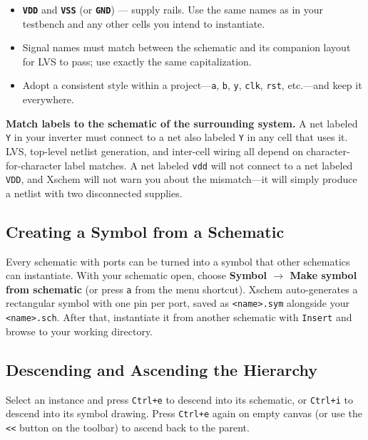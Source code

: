 \documentclass[11pt]{article}
\begin{document}
\begin{itemize}[leftmargin=2em]
  \item \textbf{\texttt{VDD}} and \textbf{\texttt{VSS}}
        (or \textbf{\texttt{GND}}) --- supply rails.
        Use the same names as in your testbench and any other
        cells you intend to instantiate.
  \item Signal names must match between the schematic and its companion
        layout for LVS to pass; use exactly the same capitalization.
  \item Adopt a consistent style within a project---\texttt{a},
        \texttt{b}, \texttt{y}, \texttt{clk}, \texttt{rst}, etc.---and
        keep it everywhere.
\end{itemize}

\begin{tipbox}
\textbf{Match labels to the schematic of the surrounding system.}
A net labeled \texttt{Y} in your inverter must connect to a net also
labeled \texttt{Y} in any cell that uses it.
LVS, top-level netlist generation, and inter-cell wiring all depend on
character-for-character label matches.
A net labeled \texttt{vdd} will not connect to a net labeled
\texttt{VDD}, and Xschem will not warn you about the mismatch---it will
simply produce a netlist with two disconnected supplies.
\end{tipbox}

\subsection{Creating a Symbol from a Schematic}

Every schematic with ports can be turned into a symbol that other
schematics can instantiate.
With your schematic open, choose \textbf{Symbol $\rightarrow$ Make
symbol from schematic} (or press \texttt{a} from the menu shortcut).
Xschem auto-generates a rectangular symbol with one pin per port,
saved as \texttt{<name>.sym} alongside your \texttt{<name>.sch}.
After that, instantiate it from another schematic with \texttt{Insert}
and browse to your working directory.

\subsection{Descending and Ascending the Hierarchy}

Select an instance and press \texttt{Ctrl+e} to descend into its
schematic, or \texttt{Ctrl+i} to descend into its symbol drawing.
Press \texttt{Ctrl+e} again on empty canvas (or use the \texttt{<<}
button on the toolbar) to ascend back to the parent.
\end{document}
